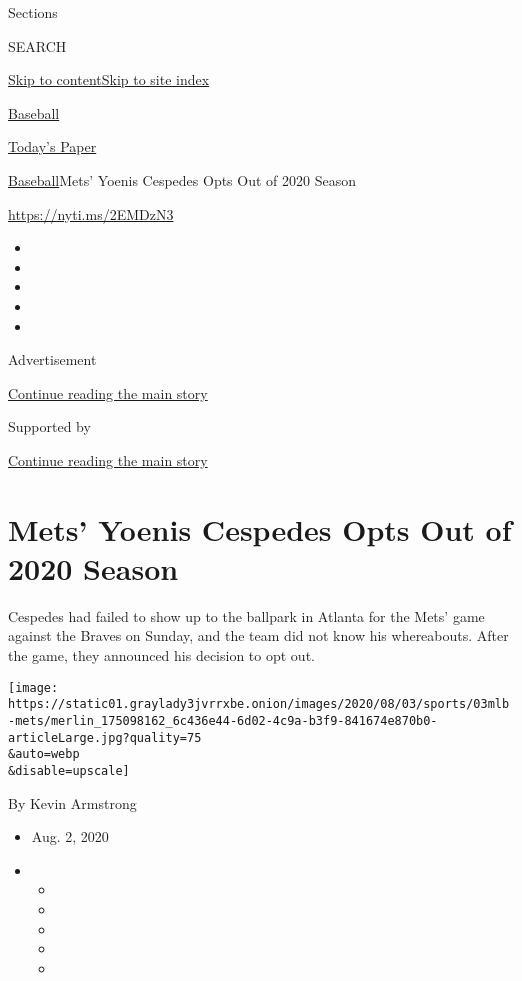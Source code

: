 Sections

SEARCH

\protect\hyperlink{site-content}{Skip to
content}\protect\hyperlink{site-index}{Skip to site index}

\href{https://www.nytimes3xbfgragh.onion/section/sports/baseball}{Baseball}

\href{https://myaccount.nytimes3xbfgragh.onion/auth/login?response_type=cookie\&client_id=vi}{}

\href{https://www.nytimes3xbfgragh.onion/section/todayspaper}{Today's
Paper}

\href{/section/sports/baseball}{Baseball}\textbar{}Mets' Yoenis Cespedes
Opts Out of 2020 Season

\url{https://nyti.ms/2EMDzN3}

\begin{itemize}
\item
\item
\item
\item
\item
\end{itemize}

Advertisement

\protect\hyperlink{after-top}{Continue reading the main story}

Supported by

\protect\hyperlink{after-sponsor}{Continue reading the main story}

\hypertarget{mets-yoenis-cespedes-opts-out-of-2020-season}{%
\section{Mets' Yoenis Cespedes Opts Out of 2020
Season}\label{mets-yoenis-cespedes-opts-out-of-2020-season}}

Cespedes had failed to show up to the ballpark in Atlanta for the Mets'
game against the Braves on Sunday, and the team did not know his
whereabouts. After the game, they announced his decision to opt out.

\texttt{[image: https://static01.graylady3jvrrxbe.onion/images/2020/08/03/sports/03mlb-mets/merlin\_175098162\_6c436e44-6d02-4c9a-b3f9-841674e870b0-articleLarge.jpg?quality=75\\\&auto=webp\\\&disable=upscale]}

By Kevin Armstrong

\begin{itemize}
\item
  Aug. 2, 2020
\item
  \begin{itemize}
  \item
  \item
  \item
  \item
  \item
  \end{itemize}
\end{itemize}

